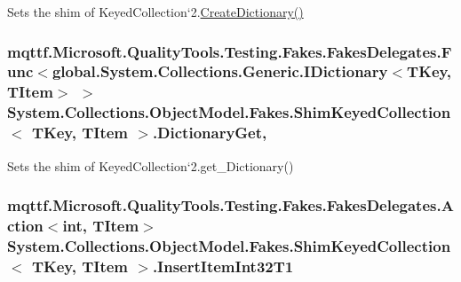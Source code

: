 Sets the shim of Keyed\-Collection`2.\hyperlink{class_system_1_1_collections_1_1_object_model_1_1_fakes_1_1_shim_keyed_collection_3_01_t_key_00_01_t_item_01_4_a910d6c888fea98902c9139829d854d91}{Create\-Dictionary()}

\hypertarget{class_system_1_1_collections_1_1_object_model_1_1_fakes_1_1_shim_keyed_collection_3_01_t_key_00_01_t_item_01_4_a4b4b08bf283cac7f10bd99bfa044bef8}{
\subsubsection[{Dictionary\-Get}]{\setlength{\rightskip}{0pt plus 5cm}mqttf.\-Microsoft.\-Quality\-Tools.\-Testing.\-Fakes.\-Fakes\-Delegates.\-Func$<$global.\-System.\-Collections.\-Generic.\-I\-Dictionary$<$T\-Key, T\-Item$>$ $>$ System.\-Collections.\-Object\-Model.\-Fakes.\-Shim\-Keyed\-Collection$<$ T\-Key, T\-Item $>$.Dictionary\-Get\hspace{0.3cm}{\ttfamily [get]}, {\ttfamily [set]}}}\label{class_system_1_1_collections_1_1_object_model_1_1_fakes_1_1_shim_keyed_collection_3_01_t_key_00_01_t_item_01_4_a4b4b08bf283cac7f10bd99bfa044bef8}


Sets the shim of Keyed\-Collection`2.get\-\_\-\-Dictionary()

\hypertarget{class_system_1_1_collections_1_1_object_model_1_1_fakes_1_1_shim_keyed_collection_3_01_t_key_00_01_t_item_01_4_ae13b9212752fcd3a4a173422413776d7}{
\subsubsection[{Insert\-Item\-Int32\-T1}]{\setlength{\rightskip}{0pt plus 5cm}mqttf.\-Microsoft.\-Quality\-Tools.\-Testing.\-Fakes.\-Fakes\-Delegates.\-Action$<$int, T\-Item$>$ System.\-Collections.\-Object\-Model.\-Fakes.\-Shim\-Keyed\-Collection$<$ T\-Key, T\-Item $>$.Insert\-Item\-Int32\-T1\hspace{0.3cm}{\ttfamily [set]}}}\label{class_system_1_1_collections_1_1_object_model_1_1_fakes_1_1_shim_keyed_collection_3_01_t_key_00_01_t_item_01_4_ae13b9212752fcd3a4a173422413776d7}


